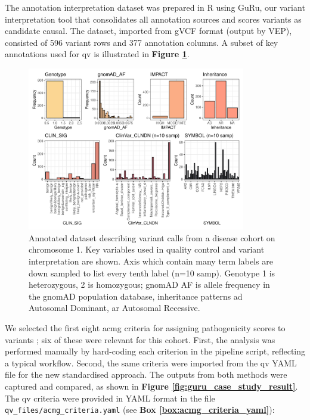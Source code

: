 The annotation interpretation dataset was prepared in R using GuRu, our variant interpretation tool that consolidates all annotation sources and scores variants as candidate causal. The dataset, imported from gVCF format (output by VEP), consisted of 596 variant rows and 377 annotation columns. A subset of key annotations used for \ac{qv} is illustrated in \textbf{Figure \ref{fig:guru_case_study_setup}}.

\begin{figure}[!h]
    \centering
   \includegraphics[width=0.85\textwidth]{./images/Guru_singlecase_distribution_variables.pdf}
       \caption{Annotated dataset describing variant calls from a disease cohort on chromosome 1. Key variables used in quality control and variant interpretation are shown. Axis which contain many term labels are down sampled to list every tenth  label (n=10 samp). Genotype 1 is heterozygous, 2 is homozygous; gnomAD AF is allele frequency in the gnomAD population database, inheritance patterns \ac{ad} Autosomal Dominant, \ac{ar} Autosomal Recessive.}
    \label{fig:guru_case_study_setup}
\end{figure}
\FloatBarrier

We selected the first eight \ac{acmg} criteria for assigning pathogenicity scores to variants \cite{richards2015standards}; six of these were relevant for this cohort. First, the analysis was performed manually by hard-coding each criterion in the pipeline script, reflecting a typical workflow. Second, the same criteria were imported from the \ac{qv} YAML file for the new standardised approach. The outputs from both methods were captured and compared, as shown in \textbf{Figure \ref{fig:guru_case_study_result}}. The \ac{qv} criteria were provided in YAML format in the file \texttt{qv\_files/acmg\_criteria.yaml} (see \textbf{Box \ref{box:acmg_criteria_yaml}}):

